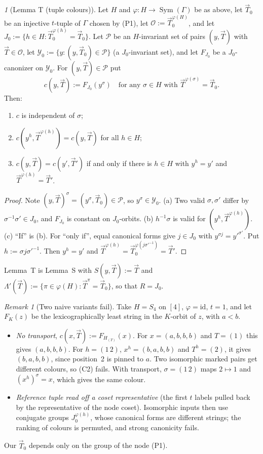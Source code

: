 \documentclass[11pt]{article}
\newenvironment{enumlab}[2][]{\begin{enumerate}\renewcommand{\theenumi}{#1#2{enumi}}%
  \renewcommand{\labelenumi}{(\theenumi)}}{\end{enumerate}}
\theoremstyle{plain}
\theoremstyle{definition}
\theoremstyle{remark}
\newtheorem{remark}[theorem]{Remark}
\theoremstyle{named}
\newtheorem*{named}{}
\theoremstyle{namedrm}
\newcommand{\Sym}{\operatorname{Sym}}
\newcommand{\cO}{\mathcal{O}}
\newcommand{\cY}{\mathcal{Y}}
\newcommand{\vT}{\vec{T}}
\begin{document}
\begin{named}[Lemma T (tuple colours)]
Let $H$ and $\varphi\colon H\to\Sym(\Gamma)$ be as above, let $\vT_0$ be an injective $t$-tuple of $\Gamma$
chosen by (P1), let $\cO:=\vT_0^{\varphi(H)}$, and let $J_0:=\{h\in H:\vT_0^{\varphi(h)}=\vT_0\}$. Let $\mathcal P$
be an $H$-invariant set of pairs $(y,\vT)$ with $\vT\in\cO$, let $\cY_0:=\{y:(y,\vT_0)\in\mathcal P\}$ (a
$J_0$-invariant set), and let $F_{J_0}$ be a $J_0$-canonizer on $\cY_0$. For $(y,\vT)\in\mathcal P$ put
\[ c(y,\vT):=F_{J_0}(y^\sigma)\quad\text{for any }\sigma\in H\text{ with }\vT^{\varphi(\sigma)}=\vT_0. \]
Then:
\begin{enumlab}{\alph}
\item $c$ is independent of $\sigma$;
\item $c(y^h,\vT^{\varphi(h)})=c(y,\vT)$ for all $h\in H$;
\item $c(y,\vT)=c(y',\vT')$ if and only if there is $h\in H$ with $y^h=y'$ and $\vT^{\varphi(h)}=\vT'$.
\end{enumlab}
\end{named}
\begin{proof}
Note $(y,\vT)^\sigma=(y^\sigma,\vT_0)\in\mathcal P$, so $y^\sigma\in\cY_0$. (a) Two valid $\sigma,\sigma'$ differ by
$\sigma^{-1}\sigma'\in J_0$, and $F_{J_0}$ is constant on $J_0$-orbits. (b) $h^{-1}\sigma$ is valid for
$(y^h,\vT^{\varphi(h)})$. (c) ``If'' is (b). For ``only if'', equal canonical forms give $j\in J_0$ with
$y^{\sigma j}=y'^{\sigma'}$. Put $h:=\sigma j\sigma'^{-1}$. Then $y^h=y'$ and
$\vT^{\varphi(h)}=\vT_0^{\varphi(j\sigma'^{-1})}=\vT'$.
\end{proof}
Lemma~T is Lemma~S with $S(y,\vT):=\vT$ and $\Lambda'(\vT):=\{\pi\in\varphi(H):\vT^\pi=\vT_0\}$, so that $R=J_0$.

\begin{remark}[Two naive variants fail]\label{rem:naive}
Take $H=S_4$ on $[4]$, $\varphi=\mathrm{id}$, $t=1$, and let $F_K(z)$ be the lexicographically least string in
the $K$-orbit of $z$, with $a<b$.
\begin{itemize}
\item \emph{No transport}, $c(x,\vT):=F_{H_{(T)}}(x)$. For $x=(a,b,b,b)$ and $T=(1)$ this gives $(a,b,b,b)$.
  For $h=(1\,2)$, $x^h=(b,a,b,b)$ and $T^h=(2)$, it gives $(b,a,b,b)$, since position~2 is pinned to $a$.
  Two isomorphic marked pairs get different colours, so (C2) fails. With transport, $\sigma=(1\,2)$ maps
  $2\mapsto1$ and $(x^h)^\sigma=x$, which gives the same colour.
\item \emph{Reference tuple read off a coset representative} (the first $t$ labels pulled back by the
  representative of the node coset). Isomorphic inputs then use conjugate groups $J_0^{\varphi(h)}$, whose
  canonical forms are different strings; the ranking of colours is permuted, and strong canonicity
  fails.
\end{itemize}
Our $\vT_0$ depends only on the group of the node (P1).
\end{remark}
\end{document}
